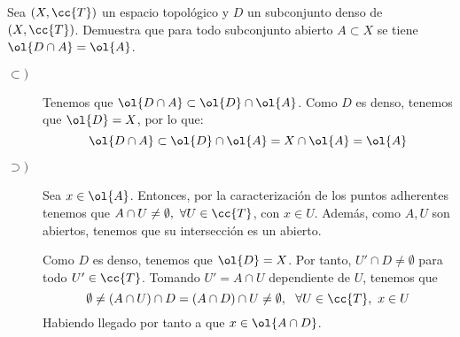 \begin{ejercicio}
    Sea $(X,\cc{T})$ un espacio topológico y $D$ un subconjunto denso de $(X,\cc{T})$. Demuestra que para todo subconjunto abierto $A\subset X$ se tiene $\ol{D\cap A}=\ol{A}$.
    \begin{description}
        \item[$\subset)$]
            Tenemos que $\ol{D\cap A}\subset \ol{D}\cap \ol{A}$. Como $D$ es denso, tenemos que $\ol{D}=X$, por lo que:
            \begin{equation*}
                \ol{D\cap A}\subset \ol{D}\cap \ol{A} = X\cap \ol{A}=\ol{A}
            \end{equation*}
            
        \item[$\supset)$] Sea $x\in \ol{A}$. Entonces, por la caracterización de los puntos adherentes tenemos que $A\cap U\neq \emptyset,~\forall U\in \cc{T}$, con $x\in U$. Además, como $A,U$ son abiertos, tenemos que su intersección es un abierto.

        Como $D$ es denso, tenemos que $\ol{D}=X$. Por tanto, $U'\cap D\neq \emptyset$ para todo $U'\in \cc{T}$. Tomando $U'=A\cap U$ dependiente de $U$, tenemos que
        $$\emptyset \neq (A\cap U)\cap D = (A\cap D)\cap U\neq \emptyset,~~\forall U\in \cc{T},~x\in U$$
        Habiendo llegado por tanto a que $x\in \ol{A\cap D}$.
    \end{description}
\end{ejercicio}

